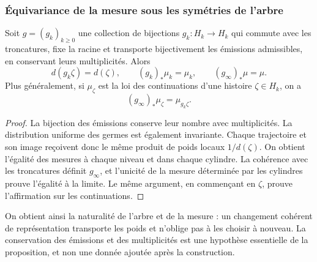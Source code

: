 \subsubsection{Équivariance de la mesure sous les symétries de l'arbre}
\label{hmtfg:base:sec:ch-naturalidad-medida}

\begin{proposition}
\label{hmtfg:base:prop:ch-naturalidad-medida}
Soit \(g=(g_k)_{k\geq0}\) une collection de bijections \(g_k:H_k\to H_k\)
qui commute avec les troncatures, fixe la racine et transporte bijectivement
les émissions admissibles, en conservant leurs multiplicités. Alors
\[
 d(g_k\zeta)=d(\zeta),\qquad
 (g_k)_*\mu_k=\mu_k,\qquad (g_\infty)_*\mu=\mu.
\]
Plus généralement, si \(\mu_\zeta\) est la loi des continuations d'une
histoire \(\zeta\in H_k\), on a
\[
 (g_\infty)_*\mu_\zeta=\mu_{g_k\zeta}.
\]
\end{proposition}

\begin{proof}
La bijection des émissions conserve leur nombre avec multiplicités. La
distribution uniforme des germes est également invariante. Chaque trajectoire
et son image reçoivent donc le même produit de poids locaux
\(1/d(\zeta)\). On obtient l'égalité des mesures à chaque niveau et dans
chaque cylindre. La cohérence avec les troncatures définit \(g_\infty\),
et l'unicité de la mesure déterminée par les cylindres prouve l'égalité
à la limite. Le même argument, en commençant en \(\zeta\), prouve
l'affirmation sur les continuations.
\end{proof}

On obtient ainsi la naturalité de l'arbre et de la mesure : un changement cohérent
de représentation transporte les poids et n'oblige pas à les choisir à nouveau.
La conservation des émissions et des multiplicités est une hypothèse essentielle de
la proposition, et non une donnée ajoutée après la construction.
